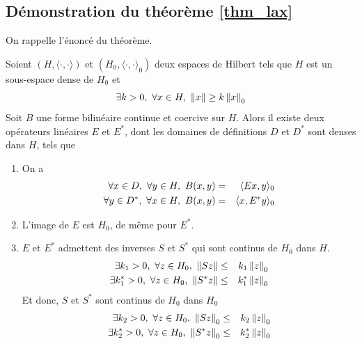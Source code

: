 \renewcommand{\appendixtocname}{Annexes}
\renewcommand{\appendixpagename}{Annexes}

\begin{appendices}
\section{Démonstration du théorème \ref{thm_lax}}\label{AnnexeA}
On rappelle l'énoncé du théorème.
\begin{theoreme}
Soient $(H, \langle \cdot, \cdot \rangle)$ et $(H_0, \langle \cdot, \cdot \rangle_0)$ deux espaces de Hilbert tels que $H$ est un sous-espace dense de $H_0$
et 
\begin{equation}\label{norm_equiv_H_H0}
    \exists k >0,\ \forall x \in H, \ \left\lVert x \right\rVert \geq k \left\lVert x \right\rVert_0
\end{equation}
Soit $B$ une forme bilinéaire continue et coercive sur $H$. Alors il existe deux opérateurs linéaires $E$ et $E^*$, dont les domaines de définitions $D$ et $D^*$ sont denses dans $H$, tels que
\begin{enumerate}
    \item On a
    \begin{eqnarray*}
        \forall x \in D,\ \forall y \in H, \ B(x,y) &=& \langle Ex, y \rangle_0 \\
        \forall y \in D^*,\ \forall x \in H, \ B(x,y) &=& \langle x, E^* y \rangle_0
    \end{eqnarray*}
    \item L'image de $E$ est $H_0$, de même pour $E^*$.
    \item $E$ et $E^*$ admettent des inverses $S$ et $S^*$ qui sont continus de $H_0$ dans $H$.
    \begin{eqnarray*}
        \exists k_1>0,\ \forall z \in H_0, \ \left\lVert Sz \right\rVert &\leq& k_1 \left\lVert z \right\rVert_0 \\
        \exists k_1^*>0,\ \forall z \in H_0, \ \left\lVert S^*z \right\rVert &\leq& k_1^* \left\lVert z \right\rVert_0
    \end{eqnarray*}
    Et donc, $S$ et $S^*$ sont continus de $H_0$ dans $H_0$
    \begin{eqnarray*}
        \exists k_2>0,\ \forall z \in H_0, \ \left\lVert Sz \right\rVert_0 &\leq& k_2 \left\lVert z \right\rVert_0 \\
        \exists k_2^*>0,\ \forall z \in H_0, \ \left\lVert S^*z \right\rVert_0 &\leq& k_2^* \left\lVert z \right\rVert_0
    \end{eqnarray*}
\end{enumerate}
\end{theoreme}


\end{appendices}
